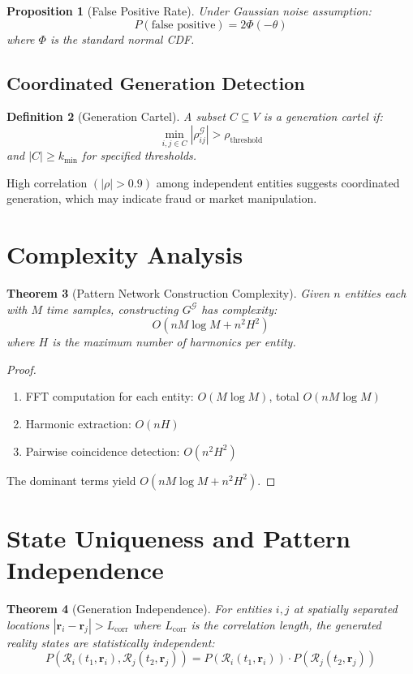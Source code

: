 \documentclass[12pt]{article}
\newtheorem{theorem}{Theorem}
\newtheorem{definition}[theorem]{Definition}
\newtheorem{proposition}[theorem]{Proposition}
\begin{document}
\begin{proposition}[False Positive Rate]
Under Gaussian noise assumption:
$$
P(\text{false positive}) = 2\Phi(-\theta)
$$
where $\Phi$ is the standard normal CDF.
\end{proposition}

\subsection{Coordinated Generation Detection}

\begin{definition}[Generation Cartel]
A subset $C \subseteq V$ is a generation cartel if:
$$
\min_{i,j \in C} |\rho_{ij}^{\mathcal{G}}| > \rho_{\text{threshold}}
$$
and $|C| \geq k_{\text{min}}$ for specified thresholds.
\end{definition}

High correlation $(|\rho| > 0.9)$ among independent entities suggests coordinated generation, which may indicate fraud or market manipulation.

\section{Complexity Analysis}

\begin{theorem}[Pattern Network Construction Complexity]
Given $n$ entities each with $M$ time samples, constructing $G^{\mathcal{G}}$ has complexity:
$$
O(nM\log M + n^2 H^2)
$$
where $H$ is the maximum number of harmonics per entity.
\end{theorem}

\begin{proof}
\begin{enumerate}
    \item FFT computation for each entity: $O(M\log M)$, total $O(nM\log M)$
    \item Harmonic extraction: $O(nH)$
    \item Pairwise coincidence detection: $O(n^2 H^2)$
\end{enumerate}
The dominant terms yield $O(nM\log M + n^2H^2)$.
\end{proof}

\section{State Uniqueness and Pattern Independence}

\begin{theorem}[Generation Independence]
For entities $i,j$ at spatially separated locations $|\mathbf{r}_i - \mathbf{r}_j| > L_{\text{corr}}$ where $L_{\text{corr}}$ is the correlation length, the generated reality states are statistically independent:
$$
P(\mathcal{R}_i(t_1, \mathbf{r}_i), \mathcal{R}_j(t_2, \mathbf{r}_j)) = P(\mathcal{R}_i(t_1, \mathbf{r}_i)) \cdot P(\mathcal{R}_j(t_2, \mathbf{r}_j))
$$
\end{theorem}
\end{document}
